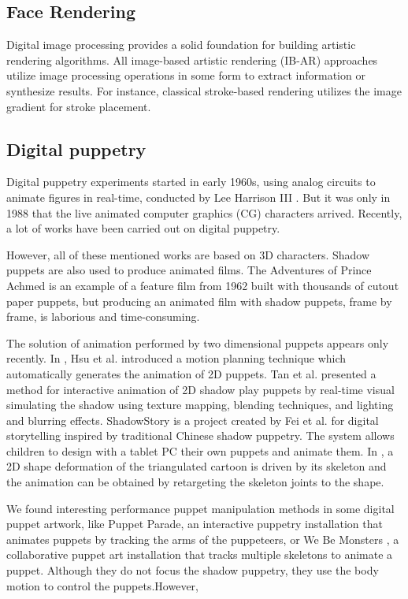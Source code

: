\documentclass[letter]{sig-alternate}
\begin{document}
\subsection{Face Rendering}

Digital image processing provides a solid foundation for building artistic rendering algorithms. All image-based artistic rendering (IB-AR) approaches utilize image processing operations in some form to extract information or synthesize results. For instance, classical stroke-based rendering utilizes the image gradient for stroke placement.

\subsection{Digital puppetry }

Digital puppetry experiments started in early 1960s, using analog circuits to animate figures in real-time, conducted by Lee Harrison III \cite{sturman1998state}. But it was only in 1988 that the live animated computer graphics (CG) characters arrived. Recently, a lot of works have been carried out on digital puppetry. 



However, all of these mentioned works are based on 3D characters. Shadow puppets are also used to produce animated films. The Adventures of Prince Achmed is an example of a feature film from 1962 built with thousands of cutout paper puppets, but producing an animated film with shadow puppets, frame by frame, is laborious and time-consuming.

The solution of animation performed by two dimensional puppets appears only recently.
In \cite{hsu2005planning}, Hsu et al. introduced a motion planning technique which automatically generates the animation of 2D puppets. Tan et al. \cite{tan2010real} presented a method for interactive animation of 2D shadow play puppets by real-time visual simulating the shadow using texture mapping, blending techniques, and lighting and blurring effects. ShadowStory \cite{lu2011shadowstory} is a project created by Fei et al. for digital storytelling inspired by traditional Chinese shadow puppetry. The system allows children to design with a tablet PC their own puppets and animate them. In \cite{pan2011sketch}, a 2D shape deformation of the triangulated cartoon is driven by its skeleton and the animation can be obtained by retargeting the skeleton joints to the shape.

We found interesting performance puppet manipulation methods in some digital puppet artwork, like Puppet Parade, an interactive puppetry installation that animates puppets by tracking the arms of the puppeteers, or We Be Monsters , a collaborative puppet art installation that tracks multiple skeletons to animate a puppet. Although they do not focus the shadow puppetry, they use the body motion to control the puppets.However, 
\end{document}
